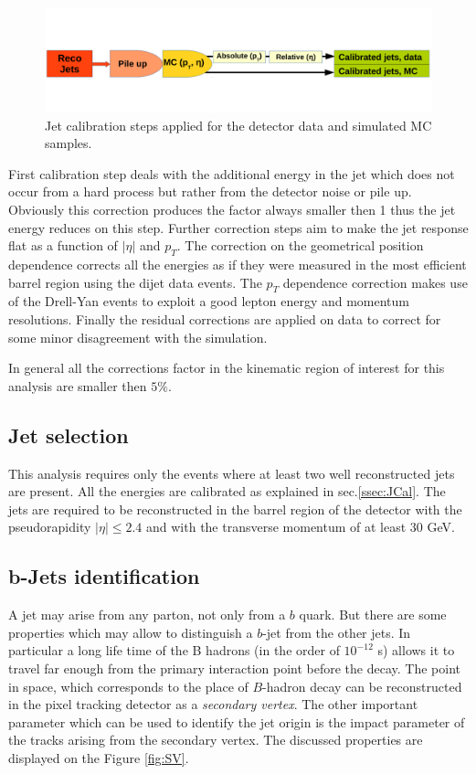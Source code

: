 \begin{figure}[h]
  \centering
  \includegraphics[width=1.0\textwidth]{04_event_reconstruction/plots/JEC.pdf}
  \caption{Jet calibration steps applied for the detector data and simulated MC samples.}
  \label{fig:JECsc}
\end{figure}

First calibration step deals with the additional energy in the jet which does not occur from a hard process but rather from the detector noise or pile up. 
Obviously this correction produces the factor always smaller then 1 thus the jet energy reduces on this step. Further correction steps aim to make the jet response
flat as a function of $|\eta|$ and $p_{T}$. The correction on the geometrical position dependence corrects all the energies as if they were measured 
in the most efficient barrel region using the dijet data events. The $p_{T}$ dependence correction makes use of the Drell-Yan events to exploit a good
lepton energy and momentum resolutions. Finally the residual corrections are applied on data to correct for some minor disagreement with the simulation.

In general all the corrections factor in the kinematic region of interest for this analysis are smaller then $5\%$.

\subsection{Jet selection}

This analysis requires only the events where at least two well reconstructed jets are present. All the energies are calibrated as explained in sec.\ref{ssec:JCal}.
The jets are required to be reconstructed in the barrel region of the detector with the pseudorapidity $|\eta| \leq 2.4$ and with the transverse momentum of at least 
30 GeV. 

\subsection{b-Jets identification}\label{ssec:bTag}

A jet may arise from any parton, not only from a $b$ quark. But there are some properties which may allow to distinguish a $b$-jet from the other jets. In particular
a long life time of the B hadrons (in the order of $10^{-12}$ s) allows it to travel far enough from the primary interaction point before the decay. The point
in space, which corresponds to the place of $B$-hadron decay can be reconstructed in the pixel tracking detector as a \textit{secondary vertex}. The other important
parameter which can be used to identify the jet origin is the impact parameter of the tracks arising from the secondary vertex. The discussed properties are 
displayed on the Figure \ref{fig:SV}.

